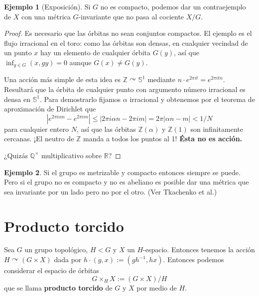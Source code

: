 \documentclass[spanish]{article}
\theoremstyle{definition}
\newtheorem*{ejem}{Ejemplo}
\newcommand{\R}{\mathbb{R}}
\newcommand{\Z}{\mathbb{Z}}
\newcommand{\Q}{\mathbb{Q}}
\newcommand{\SP}{\mathbb{S}}
\begin{document}
\begin{ejem}[Exposición]
	Si $G$ no es compacto, podemos dar un contraejemplo de $X$ con una métrica $G$-invariante que no pasa al cociente $X/G$.
\end{ejem}
\begin{proof}
	Es necesario que las órbitas no sean conjuntos compactos. El ejemplo es el flujo irracional en el toro: como las órbitas son densas, en cualquier vecindad de un punto $x$ hay un elemento de cualquier órbita $G(y)$, así que $\inf_{g\in G} (x,gy)=0$ aunque $G(x)\neq G(y)$.
	
	Una acción más simple de esta idea es $\Z\curvearrowright\SP^1$ mediante $n\cdot e^{2\pi it}=e^{2\pi itn}$. Resultará que la órbita de cualquier punto con argumento número irracional es densa en $\SP^1$. Para demostrarlo fijamos $\alpha$ irracional y obtenemos por el teorema de aproximación de Dirichlet que
	\[|e^{2\pi i\alpha n}-e^{2\pi im}|\leq|2\pi i\alpha n-2\pi im|=2\pi|\alpha n-m|<1/N\]
	para cualquier entero $N$, así que las órbitas $\Z(\alpha)$ y $\Z(1)$ son infinitamente cercanas. ¡El neutro de $\Z$ manda a todos los puntos al 1! \textbf{Ésta no es acción.}
	
	¿Quizás $\Q^\times$ multiplicativo sobre $\R$?
\end{proof}
\begin{ejem}
	Si el grupo es metrizable y compacto entonces siempre se puede. Pero si el grupo no es compacto y no es abeliano es posible dar una métrica que sea invariante por un lado pero no por el otro. (Ver Tkachenko et al.)
\end{ejem}
\section{Producto torcido}
Sea $G$ un grupo topológico, $H<G$ y $X$ un $H$-espacio. Entonces tenemos la acción $H\curvearrowright(G\times X)$ dada por $h\cdot(g,x):=(gh^{-1},hx)$. Entonces podemos considerar el espacio de órbitas 
\[G\times_HX:=(G\times X)/H\]
que se llama \textbf{producto torcido} de $G$ y $X$ por medio de $H$.
\end{document}

